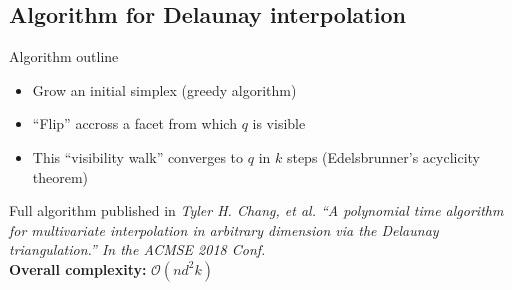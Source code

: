 \documentclass[xcolor=dvipsnames]{beamer}
\begin{document}
\subsection{Algorithm for Delaunay interpolation}
\begin{frame}{Algorithm outline}
\begin{itemize}
\item Grow an initial simplex (greedy algorithm)
\item ``Flip'' accross a facet from which $q$ is visible
\item This ``visibility walk'' converges to $q$ in $k$ steps
(Edelsbrunner's acyclicity theorem)
\end{itemize}
Full algorithm published in
{\small \it Tyler H. Chang, et al. 
``A polynomial time algorithm for multivariate interpolation in arbitrary
dimension via the Delaunay triangulation.''
In the ACMSE 2018 Conf.}\\
\medskip
{\bf Overall complexity:} $\mathcal{O}(nd^2 k)$
\end{frame}
\end{document}
